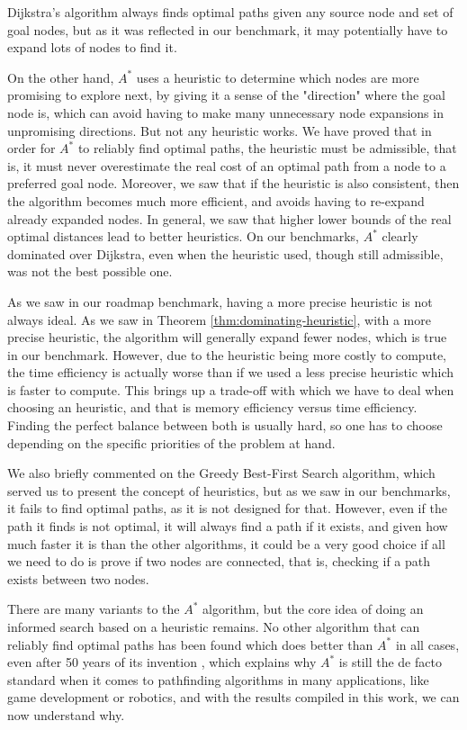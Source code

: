 \documentclass[a4paper,10pt]{report}
\begin{document}
Dijkstra's algorithm always finds optimal paths given any source node and set of goal nodes, but as it was reflected in our benchmark, it may potentially have to expand lots of nodes to find it. 

On the other hand, $A^*$ uses a heuristic to determine which nodes are more promising to explore next, by giving it a sense of the "direction" where the goal node is, which can avoid having to make many unnecessary node expansions in unpromising directions. But not any heuristic works. We have proved that in order for $A^*$ to reliably find optimal paths, the heuristic must be admissible, that is, it must never overestimate the real cost of an optimal path from a node to a preferred goal node. Moreover, we saw that if the heuristic is also consistent, then the algorithm becomes much more efficient, and avoids having to re-expand already expanded nodes. In general, we saw that higher lower bounds of the real optimal distances lead to better heuristics. On our benchmarks, $A^*$ clearly dominated over Dijkstra, even when the heuristic used, though still admissible, was not the best possible one.

As we saw in our roadmap benchmark, having a more precise heuristic is not always ideal. As we saw in Theorem \ref{thm:dominating-heuristic}, with a more precise heuristic, the algorithm will generally expand fewer nodes, which is true in our benchmark. However, due to the heuristic being more costly to compute, the time efficiency is actually worse than if we used a less precise heuristic which is faster to compute. This brings up a trade-off with which we have to deal when choosing an heuristic, and that is memory efficiency versus time efficiency. Finding the perfect balance between both is usually hard, so one has to choose depending on the specific priorities of the problem at hand.

We also briefly commented on the Greedy Best-First Search algorithm, which served us to present the concept of heuristics, but as we saw in our benchmarks, it fails to find optimal paths, as it is not designed for that. However, even if the path it finds is not optimal, it will always find a path if it exists, and given how much faster it is than the other algorithms, it could be a very good choice if all we need to do is prove if two nodes are connected, that is, checking if a path exists between two nodes.

There are many variants to the $A^*$ algorithm, but the core idea of doing an informed search based on a heuristic remains. No other algorithm that can reliably find optimal paths has been found which does better than $A^*$ in all cases, even after 50 years of its invention \cite{hart}, which explains why $A^*$ is still the de facto standard when it comes to pathfinding algorithms in many applications, like game development or robotics, and with the results compiled in this work, we can now understand why.
\end{document}
